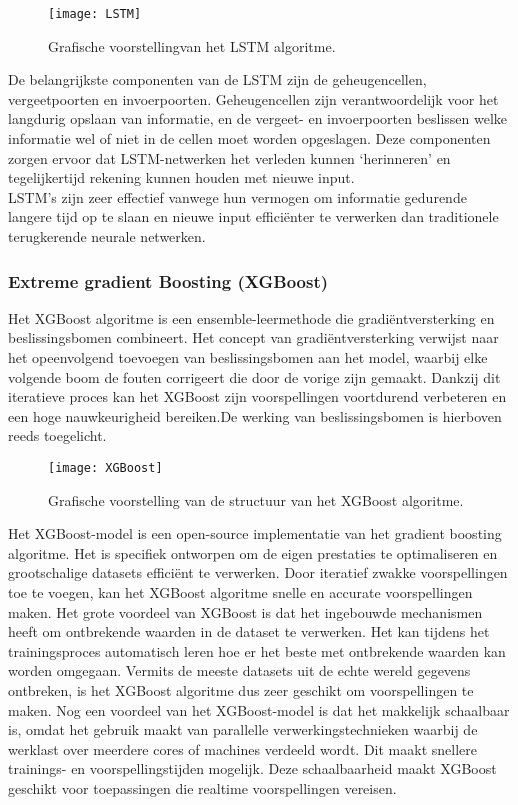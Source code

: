 \begin{figure}[h!]
    \centering\texttt{[image: LSTM]}
    \caption{\label{fig:LSTM}Grafische voorstellingvan het LSTM algoritme.}
\end{figure} 

De belangrijkste componenten van de LSTM zijn de geheugencellen, vergeetpoorten en invoerpoorten. Geheugencellen zijn verantwoordelijk voor het langdurig opslaan van informatie, en de vergeet- en invoerpoorten beslissen welke informatie wel of niet in de cellen moet worden opgeslagen. Deze componenten zorgen ervoor dat LSTM-netwerken het verleden kunnen ‘herinneren’ en tegelijkertijd rekening kunnen houden met nieuwe input. \\

LSTM's zijn zeer effectief vanwege hun vermogen om informatie gedurende langere tijd op te slaan en nieuwe input efficiënter te verwerken dan traditionele terugkerende neurale netwerken.

\subsubsection{Extreme gradient Boosting (XGBoost)}

Het XGBoost algoritme is een ensemble-leermethode die gradiëntversterking en beslissingsbomen combineert. Het concept van gradiëntversterking verwijst naar het opeenvolgend toevoegen van beslissingsbomen aan het model, waarbij elke volgende boom de fouten corrigeert die door de vorige zijn gemaakt. Dankzij dit iteratieve proces kan het XGBoost zijn voorspellingen voortdurend verbeteren en een hoge nauwkeurigheid bereiken.De werking van beslissingsbomen is hierboven reeds toegelicht. \\

\begin{figure}[h!]
    \centering\texttt{[image: XGBoost]}
    \caption{\label{fig:XGBoost}Grafische voorstelling van de structuur van het XGBoost algoritme.}
\end{figure} 

Het XGBoost-model is een open-source implementatie van het gradient boosting algoritme. Het is specifiek ontworpen om de eigen prestaties te optimaliseren en grootschalige datasets efficiënt te verwerken. Door iteratief zwakke voorspellingen toe te voegen, kan het XGBoost algoritme snelle en accurate voorspellingen maken. Het grote voordeel van XGBoost is dat het ingebouwde mechanismen heeft om ontbrekende waarden in de dataset te verwerken. Het kan tijdens het trainingsproces automatisch leren hoe er het beste met ontbrekende waarden kan worden omgegaan. Vermits de meeste datasets uit de echte wereld gegevens ontbreken, is het XGBoost algoritme dus zeer geschikt om voorspellingen te maken. Nog een voordeel van het XGBoost-model is dat het makkelijk schaalbaar is, omdat het gebruik maakt van parallelle verwerkingstechnieken waarbij de werklast over meerdere cores of machines verdeeld wordt. Dit maakt snellere trainings- en voorspellingstijden mogelijk. Deze schaalbaarheid maakt XGBoost geschikt voor toepassingen die realtime voorspellingen vereisen.

